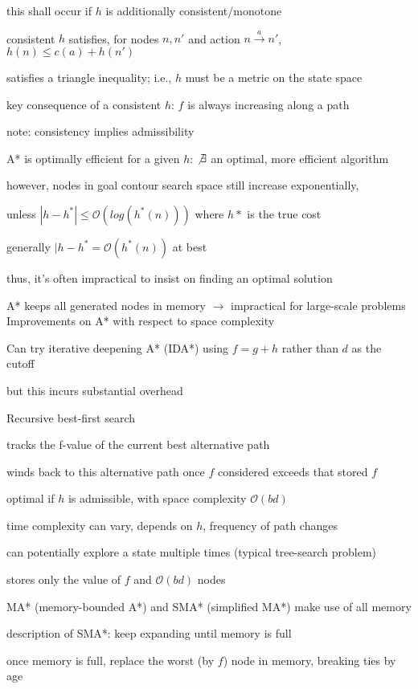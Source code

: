 \documentclass[12pt]{article}
\begin{document}
this shall occur if $h$ is additionally consistent/monotone

consistent $h$ satisfies, for nodes $n, n'$ and action $n \xrightarrow{a} n'$, $h(n) \leq c(a) + h(n')$

satisfies a triangle inequality; i.e., $h$ must be a metric on the state space

key consequence of a consistent $h$: $f$ is always increasing along a path

note: consistency implies admissibility

A* is optimally efficient for a given $h$: $\not \exists$ an optimal, more efficient algorithm

however, nodes in goal contour search space still increase exponentially, 

unless $|h - h^*| \leq \mathcal{O}(log(h^*(n)))$ where $h*$ is the true cost

generally $|h - h^* = \mathcal{O}(h^*(n))$ at best

thus, it's often impractical to insist on finding an optimal solution

A* keeps all generated nodes in memory $\to$ impractical for large-scale problems\\

\noindent
Improvements on A* with respect to space complexity

\noindent
Can try iterative deepening A* (IDA*) using $f = g + h$ rather than $d$ as the cutoff

but this incurs substantial overhead

\noindent
Recursive best-first search

tracks the f-value of the current best alternative path

winds back to this alternative path once $f$ considered exceeds that stored $f$

optimal if $h$ is admissible, with space complexity $\mathcal{O}(bd)$

time complexity can vary, depends on $h$, frequency of path changes

can potentially explore a state multiple times (typical tree-search problem)

stores only the value of $f$ and $\mathcal{O}(bd)$ nodes

\noindent
MA* (memory-bounded A*) and SMA* (simplified MA*) make use of all memory

description of SMA*: keep expanding until memory is full

once memory is full, replace the worst (by $f$) node in memory, breaking ties by age
\end{document}
